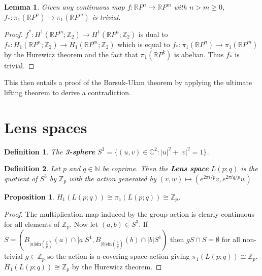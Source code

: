 \documentclass{report}
\newtheorem{definition}{Definition}
\newtheorem{lemma}{Lemma}
\newtheorem{proposition}{Proposition}
\begin{document}
\begin{lemma}
Given any continuous map $f\colon\mathbb{R}P^n\to \mathbb{R}P^m$ with $n>m\geq 0$, $f_*\colon\pi_1(\mathbb{R}P^n)\to \pi_1(\mathbb{R}P^m)$ is trivial.
\end{lemma}
\begin{proof}
 $f^*\colon H^1(\mathbb{R}P^m;\mathbb{Z}_2)\rightarrow H^1(\mathbb{R}P^n;\mathbb{Z}_2)$ is dual to $f_*\colon H_1(\mathbb{R}P^n;\mathbb{Z}_2)\rightarrow H_1(\mathbb{R}P^m;\mathbb{Z}_2)$ which is equal to $f_*\colon \pi_1(\mathbb{R}P^n)\rightarrow \pi_1(\mathbb{R}P^m)$ by the Hurewicz theorem and the fact that $\pi_1(\mathbb{R}P^k)$ is abelian. Thus $f_*$ is trivial.
\end{proof}

\noindent This then entails a proof of the Borsuk-Ulam theorem by applying the ultimate lifting theorem to derive a contradiction.


\section{Lens spaces}
\begin{definition}
The \textbf{3-sphere } $S^3=\{(u,v)\in\mathbb{C}^2:|u|^2+|v|^2=1\}$.
\end{definition}

\begin{definition}
Let $p$ and $q\in\mathbb{N}$ be coprime. Then the \textbf{Lens space} $L(p;q)$ is the quotient of $S^3$ by $\mathbb{Z}_p$ with the action generated by $(v,w)\mapsto(e^{2\pi i/p}v,e^{2\pi iq/p}w)$
\end{definition}

\begin{proposition}
$H_1(L(p;q))\cong\pi_1(L(p;q))\cong \mathbb{Z}_p$.
\end{proposition}
\begin{proof}
The multiplication map induced by the group action is clearly continuous for all elements of $\mathbb{Z}_p$.
Now let $(a,b)\in S^3$. If $S=(B_{|a|\text{sin}(\frac{\pi}{p})}(a)\cap |a|S^1,B_{|b|\text{sin}(\frac{\pi}{p})}(b)\cap |b|S^1)$ then $gS\cap S=\emptyset$ for all non-trivial $g\in \mathbb{Z}_p$ so the action is a covering space action giving $\pi_1(L(p;q))\cong \mathbb{Z}_p$. $H_1(L(p;q))\cong \mathbb{Z}_p$ by the Hurewicz theorem.
\end{proof}
\end{document}
